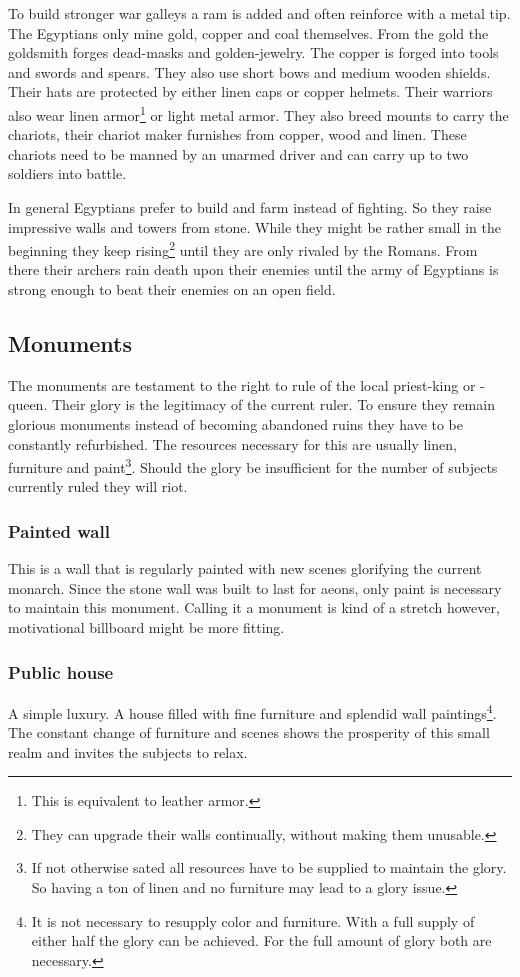 \documentclass[a4paper]{book}
\begin{document}
To build stronger war galleys a ram is added and often reinforce with a metal
tip. The \gls{Egyptians} only mine gold, copper and coal themselves. From the
gold the goldsmith forges dead-masks and golden-jewelry. The copper is forged
into tools and swords and spears. They also use short bows and medium wooden
shields. Their hats are protected by either linen caps or copper helmets. Their
warriors also wear linen armor\footnote{ This is equivalent to leather armor. }
or light metal armor. They also breed mounts to carry the chariots, their
chariot maker furnishes from copper, wood and linen. These chariots need to be
manned by an unarmed driver and can carry up to two soldiers into battle.

In general \gls{Egyptians} prefer to build and farm instead of fighting. So
they raise impressive walls and towers from stone. While they might be rather
small in the beginning they keep rising\footnote{ They can upgrade their walls
	continually, without making them unusable. } until they are only rivaled by the
\gls{Romans}. From there their archers rain death upon their enemies until the
army of \gls{Egyptians} is strong enough to beat their enemies on an open
field.

\subsection{Monuments}
The monuments are testament to the right to rule of the local priest-king or
-queen. Their glory is the legitimacy of the current ruler. To ensure they
remain glorious monuments instead of becoming abandoned ruins they have to be
constantly refurbished. The resources necessary for this are usually linen,
furniture and paint\footnote{ If not otherwise sated all resources have to be
	supplied to maintain the glory. So having a ton of linen and no furniture may
	lead to a glory issue. }. Should the glory be insufficient for the number of
subjects currently ruled they will riot.

\subsubsection{Painted wall}
This is a wall that is regularly painted with new scenes glorifying the current
monarch. Since the stone wall was built to last for aeons, only paint is
necessary to maintain this monument. Calling it a monument is kind of a stretch
however, motivational billboard might be more fitting.

\subsubsection{Public house}
A simple luxury. A house filled with fine furniture and splendid wall
paintings\footnote{ It is not necessary to resupply color and furniture. With a
	full supply of either half the glory can be achieved. For the full amount of
	glory both are necessary. }. The constant change of furniture and scenes shows
the prosperity of this small realm and invites the subjects to relax.
\end{document}
